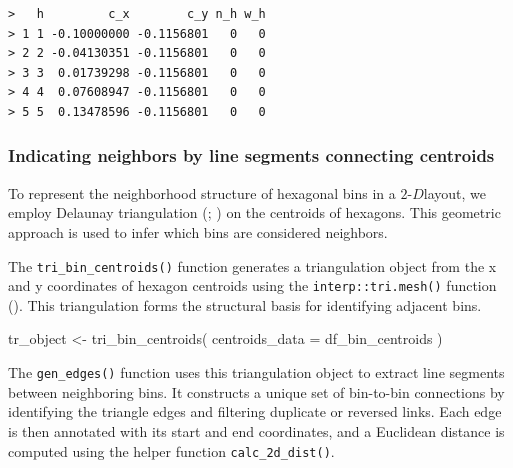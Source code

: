 \documentclass[
  11pt,
  a4paper,
]{report}
\newenvironment{Shaded}{\begin{snugshade}}{\end{snugshade}}
\newcommand{\AttributeTok}[1]{\textcolor[rgb]{0.40,0.45,0.13}{#1}}
\newcommand{\DecValTok}[1]{\textcolor[rgb]{0.68,0.00,0.00}{#1}}
\newcommand{\FunctionTok}[1]{\textcolor[rgb]{0.28,0.35,0.67}{#1}}
\newcommand{\NormalTok}[1]{\textcolor[rgb]{0.00,0.23,0.31}{#1}}
\newcommand{\OtherTok}[1]{\textcolor[rgb]{0.00,0.23,0.31}{#1}}
\newcommand{\SpecialCharTok}[1]{\textcolor[rgb]{0.37,0.37,0.37}{#1}}
\newcommand{\twoD}{$2\text{-}D$}
\begin{document}
\begin{verbatim}
>   h         c_x        c_y n_h w_h
> 1 1 -0.10000000 -0.1156801   0   0
> 2 2 -0.04130351 -0.1156801   0   0
> 3 3  0.01739298 -0.1156801   0   0
> 4 4  0.07608947 -0.1156801   0   0
> 5 5  0.13478596 -0.1156801   0   0
\end{verbatim}

\subsubsection{Indicating neighbors by line segments connecting
centroids}\label{indicating-neighbors-by-line-segments-connecting-centroids}

To represent the neighborhood structure of hexagonal bins in a
\twoD layout, we employ Delaunay triangulation
(;
) on the centroids of
hexagons. This geometric approach is used to infer which bins are
considered neighbors.

The \texttt{tri\_bin\_centroids()} function generates a triangulation
object from the x and y coordinates of hexagon centroids using the
\texttt{interp::tri.mesh()} function
(). This
triangulation forms the structural basis for identifying adjacent bins.

\begin{Shaded}
\begin{Highlighting}[]
\NormalTok{tr\_object }\OtherTok{\textless{}{-}} \FunctionTok{tri\_bin\_centroids}\NormalTok{(}
  \AttributeTok{centroids\_data =}\NormalTok{ df\_bin\_centroids}
\NormalTok{  )}
\end{Highlighting}
\end{Shaded}

The \texttt{gen\_edges()} function uses this triangulation object to
extract line segments between neighboring bins. It constructs a unique
set of bin-to-bin connections by identifying the triangle edges and
filtering duplicate or reversed links. Each edge is then annotated with
its start and end coordinates, and a Euclidean distance is computed
using the helper function \texttt{calc\_2d\_dist()}.

\begin{Shaded}
\end{Shaded}
\end{document}
